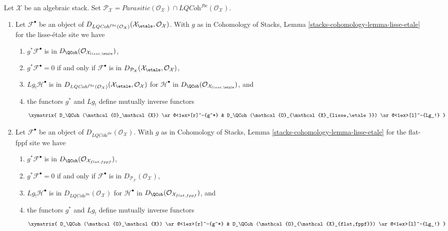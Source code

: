 \begin{lemma}
\label{lemma-derived-quasi-coherent}
Let $\mathcal{X}$ be an algebraic stack. Set
$\mathcal{P}_\mathcal{X} = \textit{Parasitic}(\mathcal{O}_\mathcal{X}) \cap
\textit{LQCoh}^{fbc}(\mathcal{O}_\mathcal{X})$.
\begin{enumerate}
\item
Let $\mathcal{F}^\bullet$ be an object of
$D_{\textit{LQCoh}^{fbc}(\mathcal{O}_\mathcal{X})}
(\mathcal{X}_\etale, \mathcal{O}_\mathcal{X})$.
With $g$ as in
Cohomology of Stacks,
Lemma \ref{stacks-cohomology-lemma-lisse-etale}
for the lisse-\'etale site we have
\begin{enumerate}
\item $g^*\mathcal{F}^\bullet$ is in
$D_\QCoh(\mathcal{O}_{\mathcal{X}_{lisse,\etale}})$,
\item $g^*\mathcal{F}^\bullet = 0$ if and only if
$\mathcal{F}^\bullet$ is in
$D_{\mathcal{P}_\mathcal{X}}(\mathcal{X}_\etale, \mathcal{O}_\mathcal{X})$,
\item $Lg_!\mathcal{H}^\bullet$ is in
$D_{\textit{LQCoh}^{fbc}(\mathcal{O}_\mathcal{X})}(
\mathcal{X}_\etale, \mathcal{O}_\mathcal{X})$
for $\mathcal{H}^\bullet$ in
$D_\QCoh(\mathcal{O}_{\mathcal{X}_{lisse,\etale}})$, and
\item the functors $g^*$ and $Lg_!$ define mutually inverse functors
$$
\xymatrix{
D_\QCoh(\mathcal{O}_\mathcal{X}) \ar@<1ex>[r]^-{g^*} &
D_\QCoh(\mathcal{O}_{\mathcal{X}_{lisse,\etale}})
\ar@<1ex>[l]^-{Lg_!}
}
$$
\end{enumerate}
\item
Let $\mathcal{F}^\bullet$ be an object of
$D_{\textit{LQCoh}^{fbc}}(\mathcal{O}_\mathcal{X})$. With $g$ as in
Cohomology of Stacks,
Lemma \ref{stacks-cohomology-lemma-lisse-etale}
for the flat-fppf site we have
\begin{enumerate}
\item $g^*\mathcal{F}^\bullet$ is in
$D_\QCoh(\mathcal{O}_{\mathcal{X}_{flat, fppf}})$,
\item $g^*\mathcal{F}^\bullet = 0$ if and only if
$\mathcal{F}^\bullet$ is in
$D_{\mathcal{P}_\mathcal{X}}(\mathcal{O}_\mathcal{X})$,
\item $Lg_!\mathcal{H}^\bullet$ is in
$D_{\textit{LQCoh}^{fbc}}(\mathcal{O}_\mathcal{X})$
for $\mathcal{H}^\bullet$ in
$D_\QCoh(\mathcal{O}_{\mathcal{X}_{flat,fppf}})$, and
\item the functors $g^*$ and $Lg_!$ define mutually inverse functors
$$
\xymatrix{
D_\QCoh(\mathcal{O}_\mathcal{X}) \ar@<1ex>[r]^-{g^*} &
D_\QCoh(\mathcal{O}_{\mathcal{X}_{flat,fppf}}) \ar@<1ex>[l]^-{Lg_!}
}
$$
\end{enumerate}
\end{enumerate}
\end{lemma}

